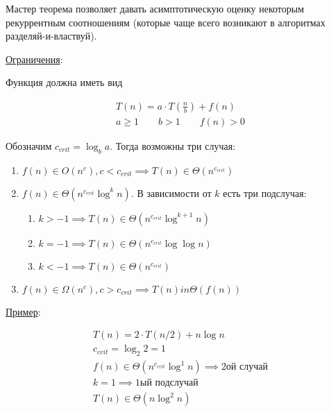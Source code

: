 
Мастер теорема позволяет давать асимптотическую оценку некоторым рекуррентным
соотношениям (которые чаще всего возникают в алгоритмах разделяй-и-властвуй).

\underline{Ограничения}:

Функция должна иметь вид

\begin{align*}
  T(n) = a \cdot T \left( \frac{n}{b} \right) + f(n) \\
  a \ge 1 \qquad b > 1 \qquad f(n) > 0
\end{align*}

Обозначим \(c_{crit} = \log_{b} a\). Тогда возможны три случая:

\begin{enumerate}
  \item \(
    f(n) \in O(n^{c}), c < c_{crit}
    \implies T(n) \in \Theta(n^{c_{crit}})
  \)

  \item \(f(n) \in \Theta(n^{c_{crit}} \log^{k} n)\). В зависимости от \(k\)
  есть три подслучая:

  \begin{enumerate}
    \item \(k > -1 \implies T(n) \in \Theta(n^{c_{crit}} \log^{k + 1} n)\)
    \item \(k = -1 \implies T(n) \in \Theta(n^{c_{crit}} \log \log n)\)
    \item \(k < -1 \implies T(n) \in \Theta(n^{c_{crit}})\)
  \end{enumerate}

  \item \(
    f(n) \in \Omega(n^{c}), c > c_{crit}
    \implies T(n) in \Theta(f(n))
  \)
\end{enumerate}

\underline{Пример}:

\begin{align*}
  T(n) = 2 \cdot T(n / 2) + n \log n \\
  c_{crit} = \log_{2} 2 = 1 \\
  f(n) \in \Theta(n^{c_{crit}} \log^{1} n) \implies \text{2ой случай} \\
  k = 1 \implies \text{1ый подслучай} \\
  T(n) \in \Theta(n \log^{2} n)
\end{align*}
